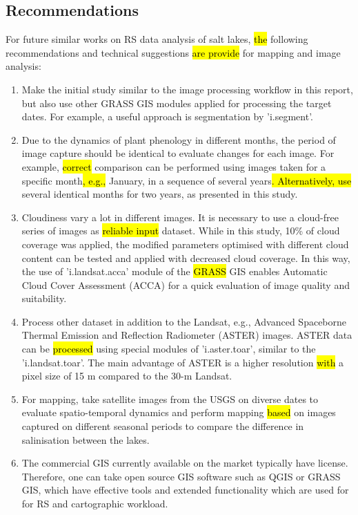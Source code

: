 \documentclass[land,article,submit,pdftex,moreauthors]{Definitions/mdpi}
\begin{document}
\subsection{Recommendations}

For future similar works on RS data analysis of salt lakes, \hl{the} following recommendations and technical suggestions \hl{are provide }for mapping and image analysis:

\begin{enumerate}
	\item Make the initial study similar to the image processing workflow in this report, but also use other GRASS GIS modules applied for processing the target dates. For example, a useful approach is segmentation by 'i.segment'.
	\item Due to the dynamics of plant phenology in different months, the period of image capture should be identical to evaluate changes for each image. For example, \hl{correct} comparison can be performed using images taken for a specific month\hl{, e.g.,} January, in a sequence of several years\hl{. Alternatively, use} several identical months for two years, as presented in this study.
	\item Cloudiness vary a lot in different images. It is necessary to use a cloud-free series of images as\hl{ reliable input} dataset. While in this study, 10\% of cloud coverage was applied, the modified parameters optimised with different cloud content can be tested and applied with decreased cloud coverage. In this way, the use of 'i.landsat.acca' module of the \hl{GRASS} GIS enables Automatic Cloud Cover Assessment (ACCA) for a quick evaluation of image quality and suitability.
	\item Process other dataset in addition to the Landsat, e.g., Advanced Spaceborne Thermal Emission and Reflection Radiometer (ASTER) images. ASTER data can be \hl{processed} using special modules of 'i.aster.toar', similar to the 'i.landsat.toar'. The main advantage of ASTER is a higher resolution \hl{with }a pixel size of 15 m compared to the 30-m Landsat. 
	\item For mapping, take satellite images from the USGS on diverse dates to evaluate spatio-temporal dynamics and perform mapping \hl{based }on images captured on different seasonal periods to compare the difference in salinisation between the lakes.
	\item The commercial GIS currently available on the market typically have license. Therefore, one can take open source GIS software such as QGIS or GRASS GIS, which have effective tools and extended functionality which are used for for RS and cartographic workload.

\end{enumerate}
\end{document}
